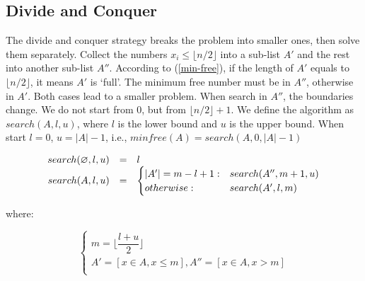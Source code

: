 \documentclass[b5paper]{article}
\begin{document}





\subsection*{Divide and Conquer}
The divide and conquer strategy breaks the problem into smaller ones, then solve them separately. Collect the numbers $x_i \leq \lfloor n/2 \rfloor$ into a sub-list $A'$ and the rest into another sub-list $A''$. According to (\ref{min-free}), if the length of $A'$ equals to $\lfloor n/2 \rfloor$, it means $A'$ is `full'. The minimum free number must be in $A''$, otherwise in $A'$. Both cases lead to a smaller problem. When search in $A''$, the boundaries change. We do not start from $0$, but from $\lfloor n/2 \rfloor + 1$. We define the algorithm as $search(A, l, u)$, where $l$ is the lower bound and $u$ is the upper bound. When start $l = 0$, $u = |A| - 1$, i.e., $minfree(A) = search(A, 0, |A|-1)$

\[
\begin{array}{rcl}
search(\varnothing, l, u) & = & l \\
search(A, l, u) & = & \begin{cases}
       |A'| = m - l + 1 : & search(A'', m+1, u) \\
       otherwise : & search(A',  l, m) \\
\end{cases}
\end{array}
\]

where:

\[
\begin{cases}
m = \lfloor \dfrac{l + u}{2} \rfloor \\
A' = [x \in A, x \leq m ], A'' = [x \in A, x > m ] \\
\end{cases}
\]
\end{document}
